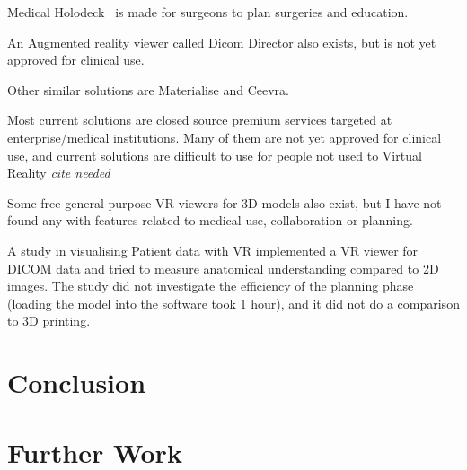 \documentclass[a4paper]{report}
\begin{document}
Medical Holodeck~\cite{medical_holodeck_medicalholodeck_nodate} is made for surgeons to plan surgeries and education.

An Augmented reality viewer called Dicom Director also exists, but is not yet approved for clinical use.\cite{dicomdirectorcom_surgeons_nodate}

Other similar solutions are Materialise\cite{materialise_medical_nodate} and
Ceevra\cite{ceevra_inc_using_2019}.

Most current solutions are closed source premium services targeted at enterprise/medical institutions. Many of them are not yet approved for clinical use, and current solutions are difficult to use for people not used to Virtual Reality \emph{cite needed}

Some free general purpose VR viewers for 3D models also exist, but I have not found any with features related to medical use, collaboration or planning.

A study in visualising Patient data with VR \cite{vertemati_virtual_2019} implemented a VR viewer for DICOM data and tried to measure anatomical understanding compared to 2D images. The study did not investigate the efficiency of the planning phase (loading the model into the software took 1 hour), and it did not do a comparison to 3D printing.

\chapter{Conclusion} \label{Conclusion}

\chapter{Further Work} \label{Further Work}

\appendix



%
%
\printbibliography
\end{document}
